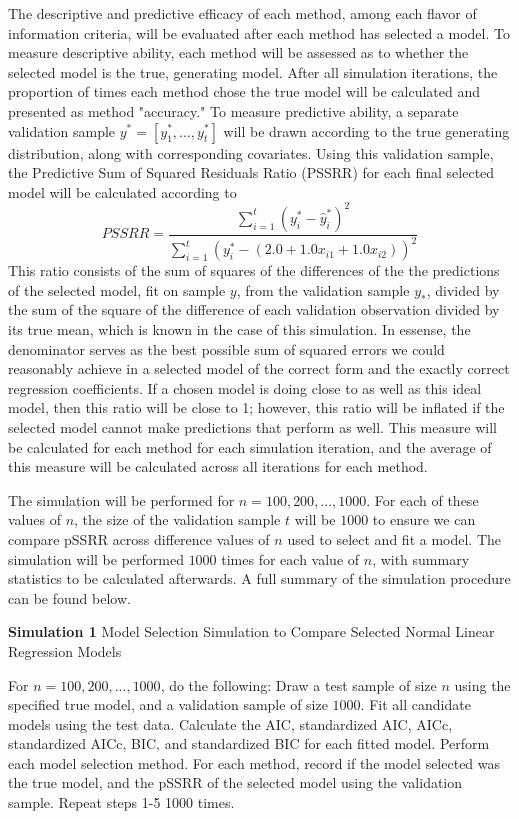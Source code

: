 		The descriptive and predictive efficacy of each method, among each flavor of information criteria, will be evaluated after each method has selected a model.
		To measure descriptive ability, each method will be assessed as to whether the selected model is the true, generating model. After all simulation iterations,
		the proportion of times each method chose the true model will be calculated and presented as method "accuracy." To measure predictive ability, a separate
		validation sample $y^* = [y^*_1,...,y^*_t]$ will be drawn according to the true generating distribution, along with corresponding covariates. Using this
		validation sample, the Predictive Sum of Squared Residuals Ratio (PSSRR) for each final selected model will be calculated according to
		\begin{equation}
			PSSRR = \frac{\sum_{i=1}^{t} (y^*_i - \hat{y}^*_i)^2}{\sum_{i=1}^{t} (y^*_i - (2.0 + 1.0x_{i1} + 1.0x_{i2}))^2}
		\end{equation}
		This ratio consists of the sum of squares of the differences of the the predictions of the selected model, fit on sample $y$, from the validation sample $y_*$,
		divided by the sum of the square of the difference of each validation observation divided by its true mean, which is known in the case of this simulation. In essense,
		the denominator serves as the best possible sum of squared errors we could reasonably achieve in a selected model of the correct form and the exactly correct regression
		coefficients. If a chosen model is doing close to as well as this ideal model, then this ratio will be close to 1; however, this ratio will be inflated if the selected model
		cannot make predictions that perform as well. This measure will be calculated for each method for each simulation iteration, and the average of this measure will be calculated
		across all iterations for each method.

		The simulation will be performed for $n = 100,200,...,1000$. For each of these values of $n$, the size of the validation sample $t$ will be
		$1000$ to ensure we can compare pSSRR across difference values of $n$ used to select and fit a model. The simulation will be performed $1000$ times for each value of $n$,
		with summary statistics to be calculated afterwards. A full summary of the simulation procedure can be found below.
		\begin{algorithm}[H]
			\caption*{\textbf{Simulation 1} Model Selection Simulation to Compare Selected Normal Linear Regression Models}
			\begin{algorithmic}[1]
			  \Statex For $n = 100,200,...,1000$, do the following:
			  \State Draw a test sample of size $n$ using the specified true model, and a validation sample of size $1000$.
			  \State Fit all candidate models using the test data.
			  \State Calculate the AIC, standardized AIC, AICc, standardized AICc, BIC, and standardized BIC for each fitted model.
			  \State Perform each model selection method.
			  \State For each method, record if the model selected was the true model, and the pSSRR of the selected model using the validation sample.
			  \State Repeat steps 1-5 1000 times.
			\end{algorithmic}
		\end{algorithm}

